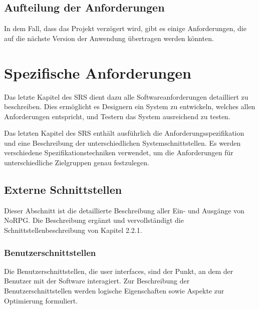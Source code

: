 	\subsection{Aufteilung der Anforderungen}
		In dem Fall, dass das Projekt verzögert wird, gibt es einige Anforderungen, die auf die nächste Version der Anwendung übertragen werden könnten.

\section{Spezifische Anforderungen}
	Das letzte Kapitel des SRS dient dazu alle Softwareanforderungen detailliert zu beschreiben. Dies ermöglicht es Designern ein System zu entwickeln, welches allen Anforderungen entspricht, und Testern das System ausreichend zu testen.
	
	Das letzten Kapitel des SRS enthält ausführlich die Anforderungsspezifikation und eine Beschreibung der unterschiedlichen Systemschnittstellen. Es werden verschiedene Spezifikationstechniken verwendet, um die Anforderungen für unterschiedliche Zielgruppen genau festzulegen.
	
	\subsection{Externe Schnittstellen}
		Dieser Abschnitt ist die detaillierte Beschreibung aller Ein- und Ausgänge von NoRPG. Die Beschreibung ergänzt und vervollständigt die Schnittstellenbeschreibung von Kapitel 2.2.1. 
	
		
		\subsubsection{Benutzerschnittstellen}
			Die Benutzerschnittstellen, die user interfaces, sind der Punkt, an dem der Benutzer mit der Software interagiert. Zur Beschreibung der Benutzerschnittstellen werden logische Eigenschaften sowie Aspekte zur Optimierung formuliert.
			
